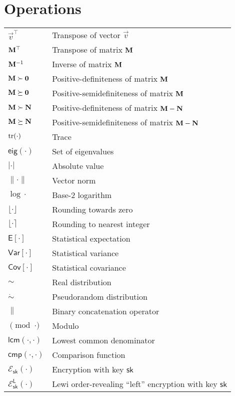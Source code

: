 \documentclass[oneside]{scrbook}
\theoremstyle{definition}
\theoremstyle{definition}
\theoremstyle{remark}
\begin{document}
\section*{Operations}
\begin{longtable}{p{}p{}}
    $\vec{v}^\top$ & Transpose of vector $\vec{v}$\\
    ${{\mathbf{M}}}^\top$ & Transpose of matrix ${{\mathbf{M}}}$\\
    ${{\mathbf{M}}}^{-1}$ & Inverse of matrix ${{\mathbf{M}}}$\\
    ${{\mathbf{M}}}\succ{\ensuremath{{\mathbf{0}}}}$ & Positive-definiteness of matrix ${{\mathbf{M}}}$\\
    ${{\mathbf{M}}}\succeq{\ensuremath{{\mathbf{0}}}}$ & Positive-semidefiniteness of matrix ${{\mathbf{M}}}$\\
    ${{\mathbf{M}}}\succ{\ensuremath{{\mathbf{N}}}}$ & Positive-definiteness of matrix ${{\mathbf{M}}}-{{\mathbf{N}}}$\\
    ${{\mathbf{M}}}\succeq{\ensuremath{{\mathbf{N}}}}$ & Positive-semidefiniteness of matrix ${{\mathbf{M}}}-{{\mathbf{N}}}$\\
    $\operatorname{tr}(\cdot)$ & Trace\\
    $\mathsf{eig}(\cdot)$ & Set of eigenvalues\\
    $|\cdot|$ & Absolute value\\
    $\lVert\cdot\rVert$ & Vector norm\\
    $\log{\cdot}$ & Base-$2$ logarithm\\
    $\lfloor\cdot\rfloor$ & Rounding towards zero\\
    $\lfloor\cdot\rceil$ & Rounding to nearest integer\\
    $\mathsf{E}[\cdot]$ & Statistical expectation\\
    $\mathsf{Var}[\cdot]$ & Statistical variance\\
    $\mathsf{Cov}[\cdot]$ & Statistical covariance\\
    $\sim$ & Real distribution\\
    $\dot{\sim}$ & Pseudorandom distribution\\
    $\|$ & Binary concatenation operator\\
    $\pmod{\cdot}$ & Modulo\\
    $\mathsf{lcm}(\cdot,\cdot)$ & Lowest common denominator\\
    $\mathsf{cmp}(\cdot,\cdot)$ & Comparison function\\
    $\mathcal{E}_{\mathsf{sk}}(\cdot)$ & Encryption with key $\mathsf{sk}$\\
    $\mathcal{E}^{\mathsf{L}}_{\mathsf{sk}}(\cdot)$ & Lewi order-revealing ``left'' encryption with key $\mathsf{sk}$\\

\end{longtable}
\end{document}
